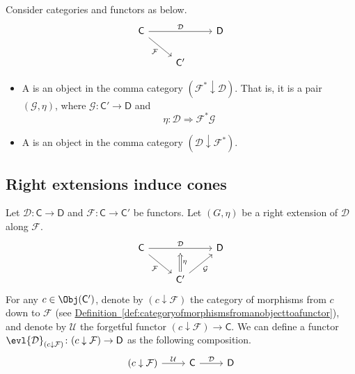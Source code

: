 \documentclass[notes.tex]{subfiles}
\begin{document}
\begin{definition}[extension]
  \label{def:extension}
  Consider categories and functors as below.
  \begin{equation*}
    \begin{tikzcd}
      \mathsf{C}
      \arrow[dr, swap, "\mathcal{F}"]
      \arrow[rr, "\mathcal{D}"]
      && \mathsf{D}
      \\
      & \mathsf{C'}
    \end{tikzcd}
  \end{equation*}
  \begin{itemize}
    \item A  is an object in the comma category $(\mathcal{F}^{*} \downarrow \mathcal{D})$. That is, it is a pair $(\mathcal{G}, \eta)$, where $\mathcal{G}\colon \mathsf{C}' \to \mathsf{D}$ and
      \begin{equation*}
        \eta\colon \mathcal{D} \Rightarrow \mathcal{F}^{*}\mathcal{G}
      \end{equation*}

    \item A  is an object in the comma category $(\mathcal{D} \downarrow \mathcal{F}^{*})$.
  \end{itemize}
\end{definition}

\subsection{Right extensions induce cones}
\label{ssc:right_extensions_induce_cones}

Let $\mathcal{D}\colon \mathsf{C} \to \mathsf{D}$ and $\mathcal{F}\colon \mathsf{C} \to \mathsf{C'}$ be functors. Let $(G, \eta)$ be a right extension of $\mathcal{D}$ along $\mathcal{F}$.
\begin{equation*}
  \begin{tikzcd}
    \mathsf{C}
    \arrow[dr, swap, "\mathcal{F}"]
    \arrow[rr, "\mathcal{D}", ""'{name=U}]
    && \mathsf{D}
    \\
    & \mathsf{C'}
    \arrow[ur, swap, "\mathcal{G}"]
    \arrow[d, to=U, Rightarrow, swap, "\eta"] 
  \end{tikzcd}
\end{equation*}
For any $c \in \Obj(\mathsf{C}')$, denote by $(c \downarrow \mathcal{F})$ the category of morphisms from $c$ down to $\mathcal{F}$ (see \hyperref[def:categoryofmorphismsfromanobjecttoafunctor]{Definition~\ref*{def:categoryofmorphismsfromanobjecttoafunctor}}), and denote by $\mathcal{U}$ the forgetful functor $(c \downarrow \mathcal{F}) \to \mathsf{C}$. We can define a functor $\evl{\mathcal{D}}_{(c \downarrow \mathcal{F})}\colon (c \downarrow \mathcal{F}) \to \mathsf{D}$ as the following composition.
\begin{equation*}
  \begin{tikzcd}
    (c \downarrow \mathcal{F})
    \arrow[r, "\mathcal{U}"]
    & \mathsf{C}
    \arrow[r, "\mathcal{D}"]
    & \mathsf{D}
  \end{tikzcd}
\end{equation*}
\end{document}
